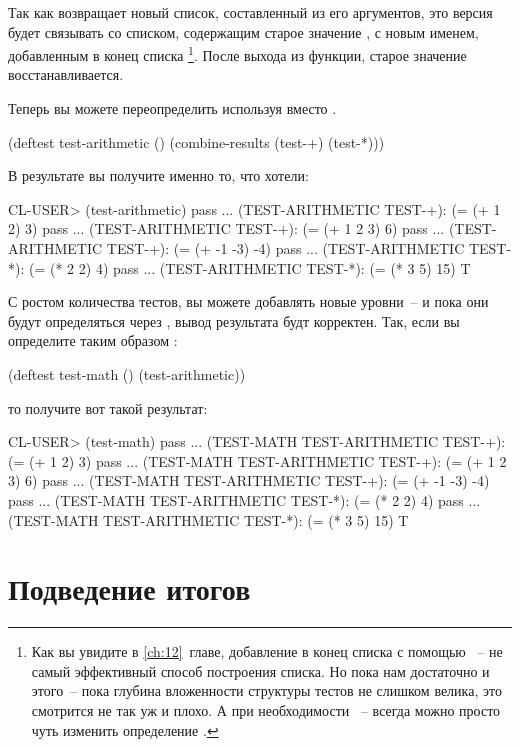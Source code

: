 Так как  возвращает новый список, составленный из его аргументов, это версия
будет связывать  со списком, содержащим старое значение
, с новым именем, добавленным в конец списка \footnote{Как вы увидите в
  \ref{ch:12}~главе, добавление в конец списка с помощью ~-- не самый эффективный
  способ построения списка. Но пока нам достаточно и этого~-- пока глубина вложенности
  структуры тестов не слишком велика, это смотрится не так уж и плохо. А при необходимости
 ~-- всегда можно просто чуть изменить определение .}. После выхода из
функции, старое значение  восстанавливается.

Теперь вы можете переопределить  используя  вместо
.

\begin{myverb}
(deftest test-arithmetic ()
  (combine-results
   (test-+)
   (test-*)))
\end{myverb}

В результате вы получите именно то, что хотели:

\begin{myverb}
CL-USER> (test-arithmetic)
pass ... (TEST-ARITHMETIC TEST-+): (= (+ 1 2) 3)
pass ... (TEST-ARITHMETIC TEST-+): (= (+ 1 2 3) 6)
pass ... (TEST-ARITHMETIC TEST-+): (= (+ -1 -3) -4)
pass ... (TEST-ARITHMETIC TEST-*): (= (* 2 2) 4)
pass ... (TEST-ARITHMETIC TEST-*): (= (* 3 5) 15)
T
\end{myverb}

С ростом количества тестов, вы можете добавлять новые уровни~-- и пока они будут
определяться через , вывод результата будт корректен. Так, если вы
определите таким образом :

\begin{myverb}
(deftest test-math ()
  (test-arithmetic))
\end{myverb}

то получите вот такой результат:

\begin{myverb}
CL-USER> (test-math)
pass ... (TEST-MATH TEST-ARITHMETIC TEST-+): (= (+ 1 2) 3)
pass ... (TEST-MATH TEST-ARITHMETIC TEST-+): (= (+ 1 2 3) 6)
pass ... (TEST-MATH TEST-ARITHMETIC TEST-+): (= (+ -1 -3) -4)
pass ... (TEST-MATH TEST-ARITHMETIC TEST-*): (= (* 2 2) 4)
pass ... (TEST-MATH TEST-ARITHMETIC TEST-*): (= (* 3 5) 15)
T
\end{myverb}

\section{Подведение итогов}


